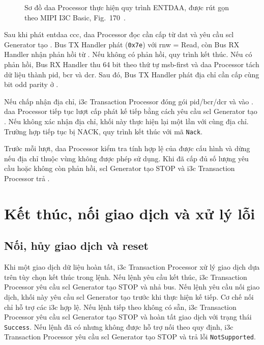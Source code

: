 \begin{figure}[!htbp]
	\centering
	\resizebox{0.3\textwidth}{!}{}
	\caption[Sơ đồ \gls{daa} Processor thực hiện ENTDAA]{Sơ đồ \gls{daa} Processor thực hiện quy trình ENTDAA, được rút gọn theo MIPI I3C Basic, Fig.~170~\cite{mipi_i3c_basic}.}
	\label{fig:entdaa-flow}
\end{figure}

Sau khi phát \gls{entdaa} \gls{ccc}, \acrshort{daa} Processor đọc \DynamicAddress{} cần cấp
từ \gls{dat} và yêu cầu \gls{scl} Generator tạo \RepeatedSTART{}. Bus TX Handler phát
\IThreeCBroadcastAddress{} (\texttt{0x7e}) với \gls{rnw} = Read, còn Bus RX Handler nhận phản hồi từ
\Target{}. Nếu không có \Target{} phản hồi, quy trình kết thúc. Nếu có phản hồi, Bus RX Handler
thu 64 bit theo thứ tự \gls{msb}-first và \acrshort{daa} Processor tách dữ liệu thành
\gls{pid}, \gls{bcr} và \gls{dcr}. Sau đó, Bus TX Handler phát địa chỉ cần cấp cùng bit odd
parity ở \OpenDrain{}.

Nếu \Target{} chấp nhận địa chỉ, \gls{i3c} Transaction Processor đóng gói
\gls{pid}/\gls{bcr}/\gls{dcr} và \DynamicAddress{} vào \RxFifo{}. \Acrshort{daa} Processor tiếp tục
lượt cấp phát kế tiếp bằng cách yêu cầu \gls{scl} Generator tạo \RepeatedSTART{}.
Nếu \Target{} không xác nhận địa chỉ, khối này thực hiện lại một lần với cùng địa chỉ. Trường hợp
tiếp tục bị NACK, quy trình kết thúc với mã \texttt{Nack}.

Trước mỗi lượt, \acrshort{daa} Processor kiểm tra tính hợp lệ của \DynamicAddress{}
được cấu hình và dừng nếu địa chỉ thuộc vùng không được phép sử dụng. Khi đã cấp đủ số lượng yêu
cầu hoặc không còn \Target{} phản hồi, \gls{scl} Generator tạo STOP và \gls{i3c} Transaction Processor trả
\ResponseDescriptor{}.

\section{Kết thúc, nối giao dịch và xử lý lỗi}

\subsection{Nối, hủy giao dịch và reset}
\label{sec:flow-end}

Khi một giao dịch dữ liệu hoàn tất, \gls{i3c} Transaction Processor xử lý giao dịch dựa trên tùy chọn
kết thúc trong lệnh. Nếu lệnh yêu cầu kết thúc, \gls{i3c} Transaction Processor yêu cầu \gls{scl} Generator
tạo STOP và nhả bus. Nếu lệnh yêu cầu nối giao dịch, khối này yêu cầu \gls{scl} Generator tạo
\RepeatedSTART{} trước khi thực hiện \CommandDescriptor{} kế tiếp. Cơ chế nối chỉ hỗ trợ các \gls{i3c}
\PrivateWriteRead{} hợp lệ. Nếu lệnh tiếp theo không có sẵn, \gls{i3c} Transaction Processor yêu cầu
\gls{scl} Generator tạo STOP và hoàn tất giao dịch với trạng thái \texttt{Success}. Nếu lệnh đã có nhưng
không được hỗ trợ nối theo quy định, \gls{i3c} Transaction Processor yêu cầu \gls{scl} Generator tạo STOP và
trả lỗi \texttt{NotSupported}.

